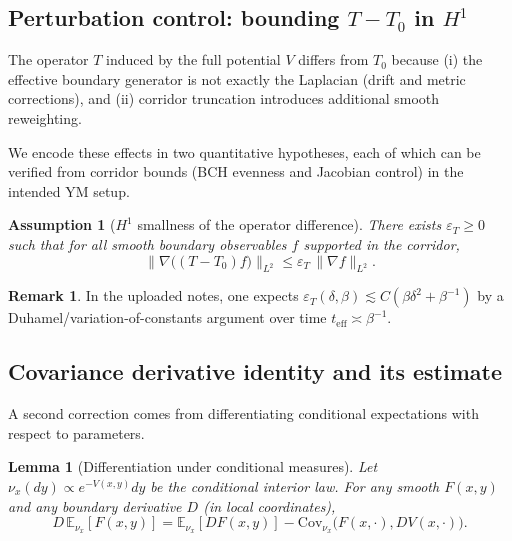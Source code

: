 \documentclass[11pt]{article}
\newtheorem{lemma}[theorem]{Lemma}
\newtheorem{assumption}[theorem]{Assumption}
\theoremstyle{definition}
\newtheorem{remark}[theorem]{Remark}
\newcommand{\E}{\mathbb{E}}
\newcommand{\Cov}{\mathrm{Cov}}
\newcommand{\1}{\mathbf{1}}
\begin{document}
\subsection{Perturbation control: bounding $T-T_0$ in $H^1$}

The operator $T$ induced by the full potential $V$ differs from $T_0$ because (i) the effective boundary generator is not exactly the Laplacian (drift and metric corrections), and (ii) corridor truncation introduces additional smooth reweighting.

We encode these effects in two quantitative hypotheses, each of which can be verified from corridor bounds (BCH evenness and Jacobian control) in the intended YM setup.

\begin{assumption}[$H^1$ smallness of the operator difference]\label{ass:HT}
There exists $\varepsilon_T\ge 0$ such that for all smooth boundary observables $f$ supported in the corridor,
\begin{equation}\label{eq:epsT}
\|\nabla\big((T-T_0)f\big)\|_{L^2}\le \varepsilon_T\,\|\nabla f\|_{L^2}.
\end{equation}
\end{assumption}

\begin{remark}
In the uploaded notes, one expects $\varepsilon_T(\delta,\beta)\lesssim C(\beta\delta^2+\beta^{-1})$ by a Duhamel/variation-of-constants argument over time $t_{\mathrm{eff}}\asymp \beta^{-1}$.
\end{remark}

\subsection{Covariance derivative identity and its estimate}

A second correction comes from differentiating conditional expectations with respect to parameters.

\begin{lemma}[Differentiation under conditional measures]\label{lem:diff-under}
Let $\nu_x(dy)\propto e^{-V(x,y)}dy$ be the conditional interior law. For any smooth $F(x,y)$ and any boundary derivative $D$ (in local coordinates),
\begin{equation}\label{eq:cov-id}
D\,\E_{\nu_x}[F(x,y)]
=\E_{\nu_x}[D F(x,y)]-\Cov_{\nu_x}\big(F(x,\cdot),D V(x,\cdot)\big).
\end{equation}
\end{lemma}
\end{document}
